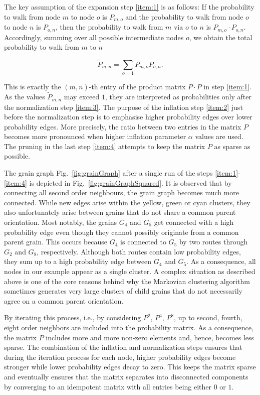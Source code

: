 \documentclass{elsarticle}
\numberwithin{equation}{section}
\begin{document}
The key assumption of the expansion step \ref{item:1} is as follows: If the probability to walk from node $m$ to node $o$ is $P_{m,o}$ and the probability to walk from node $o$ to node $n$ is $P_{o,n}$, then the probability to walk from $m$ via $o$ to $n$ is $P_{m,o} \cdot P_{o,n} $. Accordingly, summing over all possible intermediate nodes $o$, we obtain the total probability to walk from $m$ to $n$

\begin{equation}
    \label{eq:expGG}
    \tilde P_{m,n} = \sum_{o=1} P_{m,o} P_{o,n}.
\end{equation}

This is exactly the $(m,n)$-th entry of the product matrix $P \cdot P$ in step \ref{item:1}. As the values $\tilde P_{m,n}$ may exceed $1$, they are interpreted as probabilities only after the normalization step \ref{item:3}. 
The purpose of the inflation step \ref{item:2} just before the normalization step is to emphasise higher probability edges over lower probability edges. More precisely, the ratio between two entries in the matrix $P$ becomes more pronounced when higher inflation parameter $\alpha$ values are used. The pruning in the last step \ref{item:4} attempts to keep the matrix $P$ as sparse as possible.

The grain graph Fig.~\ref{fig:grainGraph} after a single run of the steps \ref{item:1}-\ref{item:4} is depicted in Fig.~\ref{fig:grainGraphSquared}. It is observed that by connecting all second order neighbours, the grain graph becomes much more connected. While new edges arise within the yellow, green or cyan clusters, they also unfortunately arise between grains that do not share a common parent orientation. Most notably, the grains $G_4$ and $G_5$ get connected with a high probability edge even though they cannot possibly originate from a common parent grain. This occurs because $G_4$ is connected to $G_5$ by two routes through $G_2$ and $G_8$, respectively. Although both routes contain low probability edges, they sum up to a high probability edge between $G_4$ and $G_5$. As a consequence, all nodes in our example appear as a single cluster. A complex situation as described above is one of the core reasons behind why the Markovian clustering algorithm sometimes generates very large clusters of child grains that do not necessarily agree on a common parent orientation. 

By iterating this process, i.e., by considering $P^{2}$, $P^{4}$, $P^{8}$, up to second, fourth, eight order neighbors are included into the probability matrix. As a consequence, the matrix $P$ includes more and more non-zero elements and, hence, becomes less sparse. The combination of the inflation and normalization steps ensures that during the iteration process for each node, higher probability edges become stronger while lower probability edges decay to zero. This keeps the matrix sparse and eventually ensures that the matrix separates into disconnected components by converging to an idempotent matrix with all entries being either $0$ or $1$.
\end{document}
